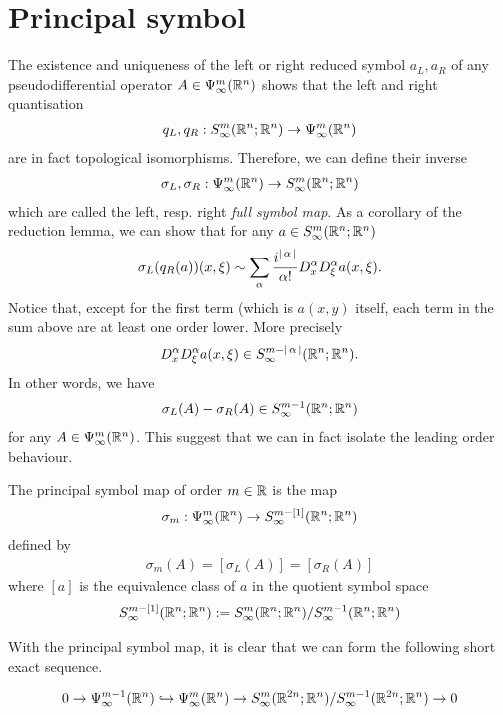\documentclass[12pt]{article}
\begin{document}
\section{Principal symbol}
The existence and uniqueness of the left or right reduced symbol $a_L, a_R$ of any pseudodifferential operator $A \in \Psi^{m}_{\infty}({\mathbb R}^n)$ shows that the left and right quantisation
\begin{align*}
q_L, q_R : S^{m}_\infty({\mathbb R}^{n}; {\mathbb R}^n) \to \Psi^{m}_{\infty}({\mathbb R}^n) 
\end{align*}
are in fact topological isomorphisms. Therefore, we can define their inverse
\begin{align*}
\sigma_L, \sigma_R : \Psi^{m}_{\infty}({\mathbb R}^n) \to S^{m}_\infty({\mathbb R}^{n}; {\mathbb R}^n)
\end{align*}
which are called the left, resp. right \textit{full symbol map}. As a corollary of the reduction lemma, we can show that for any $a \in S^{m}_\infty({\mathbb R}^{n}; {\mathbb R}^n)$
\begin{align}
\sigma_L(q_R(a))(x, \xi) \sim \sum_{\alpha} \frac{i^{\left|\, \alpha\,\right|}}{\alpha !} D^\alpha_x D^{\alpha}_\xi a(x, \xi). \label{eq: asymptotic expansion of left symbol}
\end{align}
Notice that, except for the first term (which is $a(x, y)$ itself, each term in the sum above are at least one order lower. More precisely
\begin{align*}
D^\alpha_x D^\alpha_\xi a(x, \xi) \in S^{m - \left|\, \alpha\,\right|}_\infty({\mathbb R}^{n}; {\mathbb R}^n). 
\end{align*}
In other words, we have
\begin{align*}
\sigma_L(A) - \sigma_R(A) \in S^{m -1}_\infty({\mathbb R}^{n}; {\mathbb R}^n)
\end{align*}
for any $A \in \Psi^{m}_{\infty}({\mathbb R}^n)$. This suggest that we can in fact isolate the leading order behaviour. 
\begin{fdefinition} 
    The principal symbol map of order $m \in {\ensuremath {\mathbb R}}$ is the map 
    \begin{align*}
    \sigma_m : \Psi^{m}_{\infty}({\mathbb R}^n) \to S^{m - [1]}_\infty({\mathbb R}^{n}; {\mathbb R}^n) 
    \end{align*}
    defined by 
    \begin{align*}
    \sigma_m(A) = [\sigma_L(A)] = [\sigma_R(A)]
    \end{align*}
    where $[a]$ is the equivalence class of $a$ in the quotient symbol space
    \begin{align*}
    S^{m - [1]}_\infty({\mathbb R}^{n}; {\mathbb R}^n)  :=  S^{m }_\infty({\mathbb R}^{n}; {\mathbb R}^n) / S^{m -1}_\infty({\mathbb R}^{n}; {\mathbb R}^n) 
    \end{align*}
\end{fdefinition}
With the principal symbol map, it is clear that we can form the following short exact sequence. 
\begin{flemma} 
    \begin{align*}
    0 \to \Psi^{m - 1}_{\infty}({\mathbb R}^n) \hookrightarrow  \Psi^{m}_{\infty}({\mathbb R}^n) \to S^{m}_{\infty}({\mathbb R}^{2n}; {\mathbb R}^{n}) / S^{m - 1}_{\infty}({\mathbb R}^{2n}; {\mathbb R}^{n}) \to 0 
    \end{align*}
\end{flemma}
\end{document}
